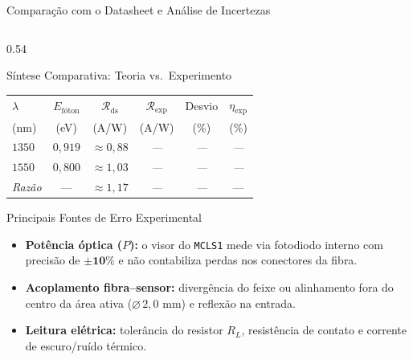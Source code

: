 \documentclass[aspectratio=169, 9pt]{beamer}
\begin{document}
\begin{frame}[shrink=2]{Comparação com o Datasheet e Análise de Incertezas}
\begin{columns}[T, onlytextwidth]
    \begin{column}{0.54\textwidth}
      \begin{block}{Síntese Comparativa: Teoria vs.\ Experimento}
        \scriptsize
        \begin{center}
          \begin{tabular}{lccccc}
            \toprule
            $\lambda$ & $E_{\text{fóton}}$ & $\mathcal{R}_{\text{ds}}$ & $\mathcal{R}_{\text{exp}}$ & Desvio & $\eta_{\text{exp}}$ \\
            (nm) & (eV) & (A/W) & (A/W) & (\%) & (\%) \\
            \midrule
            $1350$ & $0{,}919$ & $\approx 0{,}88$ & \textit{---} & \textit{---} & \textit{---} \\
            $1550$ & $0{,}800$ & $\approx 1{,}03$ & \textit{---} & \textit{---} & \textit{---} \\
            \midrule
            \textit{Razão} & --- & $\approx 1{,}17$ & \textit{---} & \textit{---} & --- \\
            \bottomrule
          \end{tabular}
        \end{center}
      \end{block}
      \vspace{-0.1cm}
      \begin{alertblock}{Principais Fontes de Erro Experimental}
        \scriptsize
        \begin{itemize}
          \item \textbf{Potência óptica ($P$):} o visor do \texttt{MCLS1} mede via fotodiodo interno com precisão de $\mathbf{\pm 10\%}$ e não contabiliza perdas nos conectores da fibra.
          \item \textbf{Acoplamento fibra--sensor:} divergência do feixe ou alinhamento fora do centro da área ativa ($\varnothing\,2{,}0\text{ mm}$) e reflexão na entrada.
          \item \textbf{Leitura elétrica:} tolerância do resistor $R_L$, resistência de contato e corrente de escuro/ruído térmico.
        \end{itemize}
      \end{alertblock}
    \end{column}
  \end{columns}
\end{frame}
\end{document}
